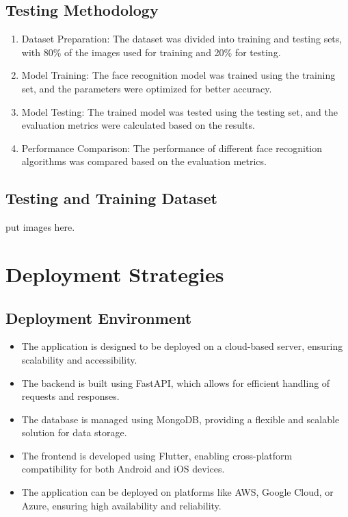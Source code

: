 \documentclass[openany]{report}
\begin{document}
\section{Testing Methodology}
\begin{enumerate}
    \item Dataset Preparation: The dataset was divided into training and testing sets, with 80\% of the images used for training and 20\% for testing.
    \item Model Training: The face recognition model was trained using the training set, and the parameters were optimized for better accuracy.
    \item Model Testing: The trained model was tested using the testing set, and the evaluation metrics were calculated based on the results.
    \item Performance Comparison: The performance of different face recognition algorithms was compared based on the evaluation metrics.
\end{enumerate}

\section{Testing and Training Dataset}

put images here. 

\chapter{Deployment Strategies}

\section{Deployment Environment}
\begin{itemize}
    \item The application is designed to be deployed on a cloud-based server, ensuring scalability and accessibility.
    \item The backend is built using FastAPI, which allows for efficient handling of requests and responses.
    \item The database is managed using MongoDB, providing a flexible and scalable solution for data storage.
    \item The frontend is developed using Flutter, enabling cross-platform compatibility for both Android and iOS devices.
    \item The application can be deployed on platforms like AWS, Google Cloud, or Azure, ensuring high availability and reliability.
\end{itemize}
\end{document}
